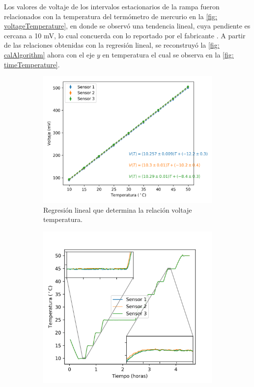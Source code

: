 	Los valores de voltaje de los intervalos estacionarios de la rampa fueron relacionados con la temperatura del termómetro de mercurio en la \autoref{fig: voltageTemperature}, en donde se observó una tendencia lineal, cuya pendiente es cercana a 10 mV, lo cual concuerda con lo reportado por el fabricante \cite{instruments1999lm35}. A partir de las relaciones obtenidas con la regresión lineal, se reconstruyó la \autoref{fig: calAlgorithm} ahora con el eje $y$ en temperatura el cual se observa en la \autoref{fig: timeTemperature}.
	\begin{figure}[h]
		\centering
		\begin{subfigure}{0.45\linewidth}
			\includegraphics[width=\linewidth]{../Data/TemperatureCalibration/V-T}
			\caption{Regresi\'on lineal que determina la relaci\'on voltaje temperatura.}
		\end{subfigure}
		\begin{subfigure}{0.45\linewidth}
			\includegraphics[width=\linewidth]{../Data/TemperatureCalibration/T-t}

\end{subfigure}
\end{figure}
